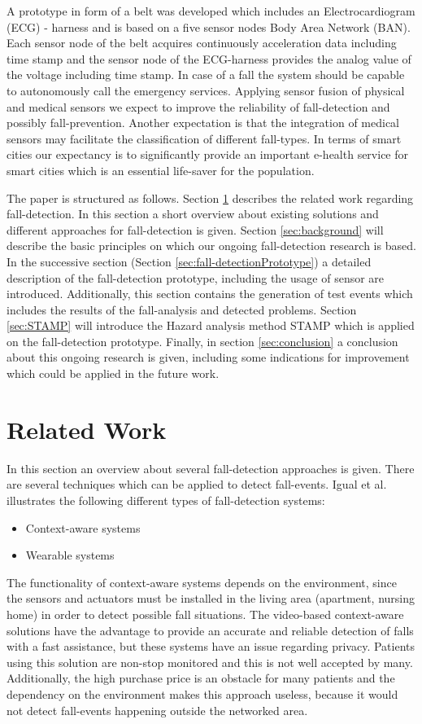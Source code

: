 \documentclass[review]{elsarticle}
\begin{document}
A prototype in form of a belt was developed which includes an Electrocardiogram (ECG) - harness and is based on a five sensor nodes Body Area Network (BAN). Each sensor node of the belt acquires continuously acceleration data including time stamp and the sensor node of the ECG-harness provides the analog value of the voltage including time stamp. In case of a fall the system should be capable to autonomously call the emergency services. Applying sensor fusion of physical and medical sensors we expect to improve the reliability of fall-detection and possibly fall-prevention. Another expectation is that the integration of medical sensors may facilitate the classification of different fall-types. In terms of smart cities our expectancy is to significantly provide an important e-health service for smart cities which is an essential life-saver for the population.

The paper is structured as follows. Section \ref{sec:relatedwork} describes the related work regarding fall-detection. In this section a short overview about existing solutions and different approaches for fall-detection is given. Section \ref{sec:background} will describe the basic principles on which our ongoing fall-detection research is based. In the successive section (Section \ref{sec:fall-detectionPrototype}) a detailed description of the fall-detection prototype, including the usage of sensor are introduced. Additionally, this section contains the generation of test events which includes the results of the fall-analysis and detected problems. Section \ref{sec:STAMP} will introduce the Hazard analysis method STAMP which is applied on the fall-detection prototype.
Finally, in section \ref{sec:conclusion} a conclusion about this ongoing research is given, including some indications for improvement which could be applied in the future work.

\section{Related Work}
\label{sec:relatedwork}
In this section an overview about several fall-detection approaches is given. There are several techniques which can be applied to detect fall-events. Igual et al. \cite{Igual2013} illustrates the following different types of fall-detection  systems:
\begin{itemize}
	\item Context-aware systems
	\item Wearable systems
\end{itemize}
The functionality of context-aware systems depends on the environment, since the sensors and actuators must be installed in the living area (apartment, nursing home) in order to detect possible fall situations. The video-based context-aware solutions have the advantage to provide an accurate and reliable detection of falls with a fast assistance, but these systems have an issue regarding privacy. Patients using this solution are non-stop monitored and this is not well accepted by many. Additionally, the high purchase price is an obstacle for many patients and the dependency on the environment makes this approach useless, because it would not detect fall-events happening outside the networked area.
\end{document}

